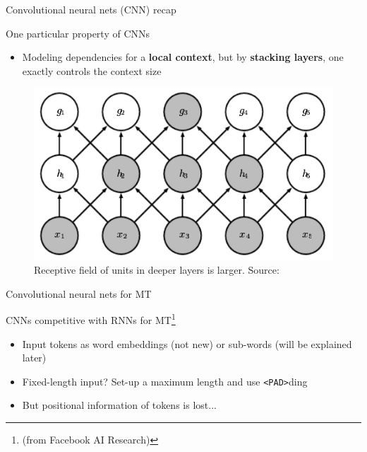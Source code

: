 \documentclass[12pt,aspectratio=169,handout]{beamer}
\begin{document}
\begin{frame}{Convolutional neural nets (CNN) recap}
	
	One particular property of CNNs
	
	\begin{itemize}
		\item Modeling dependencies for a \textbf{local context}, but by \textbf{stacking layers}, one exactly controls the context size
	\end{itemize}	
	
	
	\begin{figure}
		
		\includegraphics[width=0.5\linewidth]{img/dl-book-cnn.png}	
		\caption{Receptive field of units in deeper layers is larger. Source: }
	\end{figure}
\end{frame}


\begin{frame}{Convolutional neural nets for MT}
	
	CNNs competitive with RNNs for MT\footnote{ (from Facebook AI Research)}
	
	\begin{itemize}
		\item Input tokens as word embeddings (not new) or sub-words (will be explained later)
		\item Fixed-length input? Set-up a maximum length and use \texttt{<PAD>}ding
		\item But positional information of tokens is lost...
	\end{itemize}
\end{frame}
\end{document}
